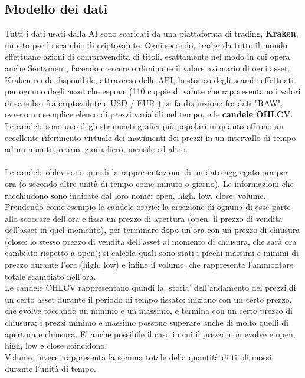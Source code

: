 \documentclass{article}
\numberwithin{equation}{section}
\begin{document}
	\subsection{Modello dei dati}
		Tutti i dati usati dalla AI sono scaricati da una piattaforma di trading, \textbf{Kraken}, un sito per lo scambio di criptovalute. Ogni secondo, trader da tutto il mondo effettuano azioni di compravendita di titoli, esattamente nel modo in cui opera anche Sentyment, facendo crescere o diminuire il valore azionario di ogni asset. Kraken rende disponibile, attraverso delle API, lo storico degli scambi effettuati per ognuno degli asset che espone (110 coppie di valute che rappresentano i valori di scambio fra criptovalute e USD / EUR ): si fa distinzione fra dati "RAW", ovvero un semplice elenco di prezzi variabili nel tempo, e le \textbf{candele OHLCV}. Le candele sono uno degli strumenti grafici più popolari in quanto offrono un eccellente riferimento virtuale dei movimenti dei prezzi in un intervallo di tempo ad un minuto, orario, giornaliero, mensile ed altro.
		\\~\\		
		Le candele ohlcv sono quindi la rappresentazione di un dato aggregato ora per ora (o secondo altre unità di tempo come minuto o giorno). Le informazioni che racchiudono sono indicate dal loro nome: open, high, low, close, volume. Prendendo come esempio le candele orarie: la creazione di ognuna di esse parte allo scoccare dell'ora e fissa un prezzo di apertura (open: il prezzo di vendita dell'asset in quel momento), per terminare dopo un'ora con un prezzo di chiusura (close: lo stesso prezzo di vendita dell'asset al momento di chiusura, che sarà ora cambiato rispetto a open); si calcola quali sono stati i picchi massimi e minimi di prezzo durante l'ora (high, low) e infine il volume, che rappresenta l'ammontare totale scambiato nell'ora.\\ Le candele OHLCV rappresentano quindi la 'storia' dell'andamento dei prezzi di un certo asset durante il periodo di tempo fissato: iniziano con un certo prezzo, che evolve toccando un minimo e un massimo, e termina con un certo prezzo di chiusura; i prezzi minimo e massimo possono superare anche di molto quelli di apertura e chiusura. E' anche possibile il caso in cui il prezzo non evolve e open, high, low e close coincidono.\\ Volume, invece, rappresenta la somma totale della quantità di titoli mossi durante l'unità di tempo.
		\\~\\
		
\end{document}
